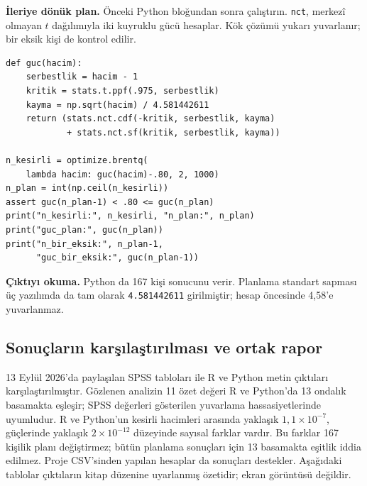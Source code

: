 \par\noindent\begin{minipage}{\linewidth}
\textbf{İleriye dönük plan.} Önceki Python bloğundan sonra çalıştırın.
\texttt{nct}, merkezî olmayan $t$ dağılımıyla iki kuyruklu gücü
hesaplar. Kök çözümü yukarı yuvarlanır; bir eksik kişi de kontrol edilir.

\begin{lstlisting}[style=prismPythonApp]
def guc(hacim):
    serbestlik = hacim - 1
    kritik = stats.t.ppf(.975, serbestlik)
    kayma = np.sqrt(hacim) / 4.581442611
    return (stats.nct.cdf(-kritik, serbestlik, kayma)
            + stats.nct.sf(kritik, serbestlik, kayma))

n_kesirli = optimize.brentq(
    lambda hacim: guc(hacim)-.80, 2, 1000)
n_plan = int(np.ceil(n_kesirli))
assert guc(n_plan-1) < .80 <= guc(n_plan)
print("n_kesirli:", n_kesirli, "n_plan:", n_plan)
print("guc_plan:", guc(n_plan))
print("n_bir_eksik:", n_plan-1,
      "guc_bir_eksik:", guc(n_plan-1))
\end{lstlisting}

\textbf{Çıktıyı okuma.} Python da 167 kişi sonucunu verir.
Planlama standart sapması üç yazılımda da tam olarak
\texttt{4.581442611} girilmiştir; hesap öncesinde 4,58'e yuvarlanmaz.
\end{minipage}\par

\subsection{Sonuçların karşılaştırılması ve ortak rapor}
13 Eylül 2026'da paylaşılan SPSS tabloları ile R ve Python metin
çıktıları karşılaştırılmıştır. Gözlenen analizin 11 özet değeri
R ve Python'da 13 ondalık basamakta eşleşir; SPSS değerleri gösterilen
yuvarlama hassasiyetlerinde uyumludur. R ve Python'un kesirli hacimleri
arasında yaklaşık $1{,}1\times10^{-7}$, güçlerinde yaklaşık
$2\times10^{-12}$ düzeyinde sayısal farklar vardır. Bu farklar
167 kişilik planı değiştirmez; bütün planlama sonuçları için
13 basamakta eşitlik iddia edilmez. Proje CSV'sinden yapılan hesaplar
da sonuçları destekler. Aşağıdaki tablolar çıktıların kitap düzenine
uyarlanmış özetidir; ekran görüntüsü değildir.

